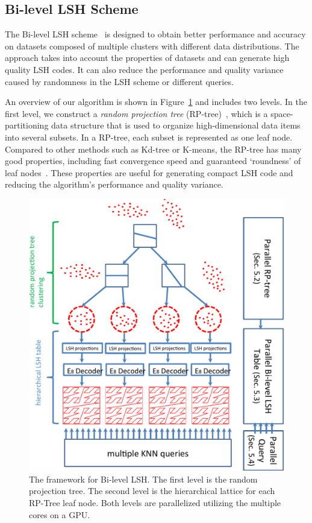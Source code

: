 \subsection{Bi-level LSH Scheme}
\label{sec:6:overview:lsh}
The Bi-level LSH scheme~\cite{BilevelLSH2011} is designed to obtain better performance and accuracy on datasets composed of multiple clusters with different data distributions. The approach takes into account the properties of datasets and can generate high quality LSH codes. It can also reduce the performance and quality variance caused by randomness in the LSH scheme or different queries.

An overview of our algorithm is shown in Figure~\ref{fig:6:overview} and includes two levels.
In the first level, we construct a \emph{random projection tree} (RP-tree)~\cite{yoav:nips:2007,Dasgupta:2008}, which is a space-partitioning data structure that is used to organize high-dimensional data items into several subsets. In a RP-tree, each subset is represented as one leaf node. Compared to other methods such as Kd-tree or K-means, the RP-tree has many good properties, including fast convergence speed and guaranteed `roundness' of leaf nodes~\cite{Dasgupta:2008,aman:nips:2010}. These properties are useful for generating compact LSH code and reducing the algorithm's performance and quality variance.
\begin{figure}[!h]
  \centering
  \includegraphics[width=0.8\linewidth]{figs/6/overview.pdf}
  \caption[Bi-level LSH framework]{\label{fig:6:overview} The framework for Bi-level LSH. The first level is the random projection tree. The second level is the hierarchical lattice for each RP-Tree leaf node. Both levels are parallelized utilizing the multiple cores on a GPU. }
\end{figure}
